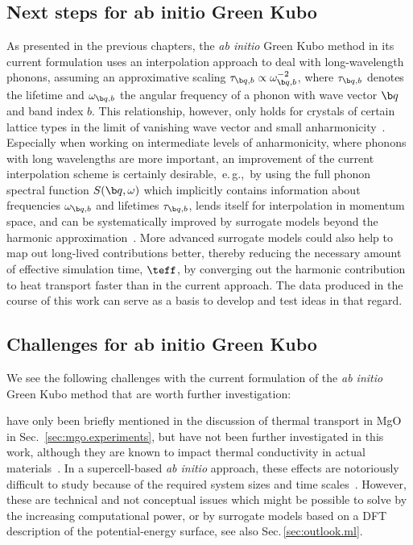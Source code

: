 \subsection{Next steps for ab initio Green Kubo}
As presented in the previous chapters, the \emph{ab initio} Green Kubo method in its current formulation uses an interpolation approach to deal with long-wavelength phonons, assuming an approximative scaling $\tau_{\b q, b} \propto \omega^{-2}_{\b q, b}$, where $\tau_{\b q, b}$ denotes the lifetime and $\omega_{\b q, b}$ the angular frequency of a phonon with wave vector $\b q$ and band index $b$. This relationship, however, only holds for crystals of certain lattice types in the limit of vanishing wave vector and small anharmonicity~\cite{Herring1954}. Especially when working on intermediate levels of anharmonicity, where phonons with long wavelengths are more important, an improvement of the current interpolation scheme is certainly desirable,~e.\,g.,~by using the full phonon spectral function $S(\b q, \omega)$ which implicitly contains information about frequencies $\omega_{\b q, b}$ and lifetimes $\tau_{\b q, b}$, lends itself for interpolation in momentum space, and can be systematically improved by surrogate models beyond the harmonic approximation~\cite{Maradudin1962}. More advanced surrogate models could also help to map out long-lived contributions better, thereby reducing the necessary amount of effective simulation time, $\teff$, by converging out the harmonic contribution to heat transport faster than in the current approach. The data produced in the course of this work can serve as a basis to develop and test ideas in that regard.


\subsection{Challenges for ab initio Green Kubo}
We see the following challenges with the current formulation of the \emph{ab initio} Green Kubo method that are worth further investigation: 

 have only been briefly mentioned in the discussion of thermal transport in MgO in Sec.~\ref{sec:mgo.experiments}, but have not been further investigated in this work, although they are known to impact thermal conductivity in actual materials~\cite{Bisson2000}. In a supercell-based \emph{ab initio} approach, these effects are notoriously difficult to study because of the required system sizes and time scales~\cite{Gibbons2011}. However, these are technical and not conceptual issues which might be possible to solve by the increasing computational power, or by surrogate models based on a DFT description of the potential-energy surface, see also Sec.\,\ref{sec:outlook.ml}.

